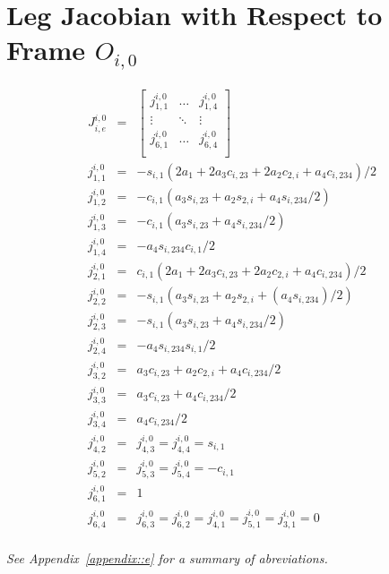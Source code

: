 \chapter{Leg Jacobian with Respect to Frame $O_{i,0}$}
\label{appendix::a}
	\vspace{-10mm}
	\begin{eqnarray*}
		J^{i,0}_{i,e} &=& 
		\left[
			\begin{array}{ccc}
				j_{1,1}^{i,0}	& \ldots 		& j_{1,4}^{i,0} 	\\
				\vdots 			& \ddots 		& \vdots 			\\
				j_{6,1}^{i,0}	& \ldots 	 	& j_{6,4}^{i,0} 	\\
			\end{array}
		\right]\\
		j_{1,1}^{i,0} &=& -s_{i,1} (2 a_{1} + 2 a_{3} c_{i,23} + 2 a_{2} c_{2,i} + a_{4} c_{i,234})/2\nonumber\\
		j_{1,2}^{i,0} &=& -c_{i,1} (a_{3} s_{i,23} + a_{2} s_{2,i} + a_{4} s_{i,234}/2)				\nonumber\\
		j_{1,3}^{i,0} &=& -c_{i,1} (a_{3} s_{i,23} + a_{4} s_{i,234}/2)								\nonumber\\
		j_{1,4}^{i,0} &=& -a_{4} s_{i,234} c_{i,1}/2 												\nonumber\\
		j_{2,1}^{i,0} &=& c_{i,1} (2 a_{1} + 2 a_{3} c_{i,23} + 2 a_{2} c_{2,i} + a_{4} c_{i,234})/2\nonumber\\
		j_{2,2}^{i,0} &=& -s_{i,1} (a_{3} s_{i,23} + a_{2} s_{2,i} + (a_{4} s_{i,234})/2)				\nonumber\\
		j_{2,3}^{i,0} &=& -s_{i,1} (a_{3} s_{i,23} + a_{4} s_{i,234}/2)								\nonumber\\
		j_{2,4}^{i,0} &=& -a_{4} s_{i,234} s_{i,1}/2 												\nonumber\\
		j_{3,2}^{i,0} &=& a_{3} c_{i,23} + a_{2} c_{2,i} + a_{4} c_{i,234}/2						\nonumber\\
		j_{3,3}^{i,0} &=& a_{3} c_{i,23} + a_{4} c_{i,234}/2										\nonumber\\
		j_{3,4}^{i,0} &=& a_{4} c_{i,234}/2 														\nonumber\\
		j_{4,2}^{i,0} &=& j_{4,3}^{i,0} = j_{4,4}^{i,0} = s_{i,1}									\nonumber\\
		j_{5,2}^{i,0} &=& j_{5,3}^{i,0}	= j_{5,4}^{i,0}	= -c_{i,1}									\nonumber\\
		j_{6,1}^{i,0} &=& 1																			\nonumber\\
		j_{6,4}^{i,0} &=& j_{6,3}^{i,0} = j_{6,2}^{i,0} = j_{4,1}^{i,0} = j_{5,1}^{i,0} = j_{3,1}^{i,0} = 0															\nonumber\\
		\label{eq::leg_jacobian}
	\end{eqnarray*}

	\noindent
	\emph{See Appendix~\ref{appendix::e} for a summary of abreviations.}